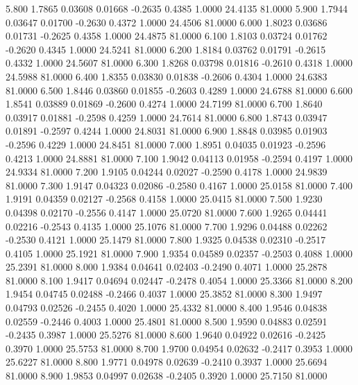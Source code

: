    5.800   1.7865   0.03608   0.01668  -0.2635   0.4385   1.0000  24.4135  81.0000
   5.900   1.7944   0.03647   0.01700  -0.2630   0.4372   1.0000  24.4506  81.0000
   6.000   1.8023   0.03686   0.01731  -0.2625   0.4358   1.0000  24.4875  81.0000
   6.100   1.8103   0.03724   0.01762  -0.2620   0.4345   1.0000  24.5241  81.0000
   6.200   1.8184   0.03762   0.01791  -0.2615   0.4332   1.0000  24.5607  81.0000
   6.300   1.8268   0.03798   0.01816  -0.2610   0.4318   1.0000  24.5988  81.0000
   6.400   1.8355   0.03830   0.01838  -0.2606   0.4304   1.0000  24.6383  81.0000
   6.500   1.8446   0.03860   0.01855  -0.2603   0.4289   1.0000  24.6788  81.0000
   6.600   1.8541   0.03889   0.01869  -0.2600   0.4274   1.0000  24.7199  81.0000
   6.700   1.8640   0.03917   0.01881  -0.2598   0.4259   1.0000  24.7614  81.0000
   6.800   1.8743   0.03947   0.01891  -0.2597   0.4244   1.0000  24.8031  81.0000
   6.900   1.8848   0.03985   0.01903  -0.2596   0.4229   1.0000  24.8451  81.0000
   7.000   1.8951   0.04035   0.01923  -0.2596   0.4213   1.0000  24.8881  81.0000
   7.100   1.9042   0.04113   0.01958  -0.2594   0.4197   1.0000  24.9334  81.0000
   7.200   1.9105   0.04244   0.02027  -0.2590   0.4178   1.0000  24.9839  81.0000
   7.300   1.9147   0.04323   0.02086  -0.2580   0.4167   1.0000  25.0158  81.0000
   7.400   1.9191   0.04359   0.02127  -0.2568   0.4158   1.0000  25.0415  81.0000
   7.500   1.9230   0.04398   0.02170  -0.2556   0.4147   1.0000  25.0720  81.0000
   7.600   1.9265   0.04441   0.02216  -0.2543   0.4135   1.0000  25.1076  81.0000
   7.700   1.9296   0.04488   0.02262  -0.2530   0.4121   1.0000  25.1479  81.0000
   7.800   1.9325   0.04538   0.02310  -0.2517   0.4105   1.0000  25.1921  81.0000
   7.900   1.9354   0.04589   0.02357  -0.2503   0.4088   1.0000  25.2391  81.0000
   8.000   1.9384   0.04641   0.02403  -0.2490   0.4071   1.0000  25.2878  81.0000
   8.100   1.9417   0.04694   0.02447  -0.2478   0.4054   1.0000  25.3366  81.0000
   8.200   1.9454   0.04745   0.02488  -0.2466   0.4037   1.0000  25.3852  81.0000
   8.300   1.9497   0.04793   0.02526  -0.2455   0.4020   1.0000  25.4332  81.0000
   8.400   1.9546   0.04838   0.02559  -0.2446   0.4003   1.0000  25.4801  81.0000
   8.500   1.9590   0.04883   0.02591  -0.2435   0.3987   1.0000  25.5276  81.0000
   8.600   1.9640   0.04922   0.02616  -0.2425   0.3970   1.0000  25.5753  81.0000
   8.700   1.9700   0.04954   0.02632  -0.2417   0.3953   1.0000  25.6227  81.0000
   8.800   1.9771   0.04978   0.02639  -0.2410   0.3937   1.0000  25.6694  81.0000
   8.900   1.9853   0.04997   0.02638  -0.2405   0.3920   1.0000  25.7150  81.0000
